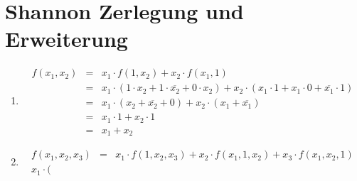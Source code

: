 \documentclass[DIN, pagenumber=false, fontsize=11pt, parskip=half]{scrartcl}
\begin{document}
    \section{Shannon Zerlegung und Erweiterung}
    \setcounter{subsection}{3}
    \begin{enumerate}[label=(\alph*)]
        \item 
            \begin{eqnarray*}
                f(x_1, x_2) &=& x_1 \cdot f(1, x_2) + x_2 \cdot f(x_1, 1) \\
                &=& x_1 \cdot (1 \cdot x_2 + 1 \cdot \overline{x_2} + 0 \cdot x_2) + x_2 \cdot (x_1 \cdot 1 + x_1 \cdot 0 + \overline{x_1} \cdot 1) \\
                &=& x_1 \cdot (x_2 + \overline{x_2} + 0) + x_2 \cdot (x_1 + \overline{x_1}) \\
                &=& x_1 \cdot 1 + x_2 \cdot 1 \\
                &=& x_1 + x_2 
            \end{eqnarray*}
        \item 
            \begin{eqnarray*}
                f(x_1, x_2, x_3) &=& x_1 \cdot f(1, x_2, x_3) + x_2 \cdot f(x_1, 1, x_2) + x_3 \cdot f(x_1, x_2, 1) \\
                x_1 \cdot (
            \end{eqnarray*}
    \end{enumerate}
\end{document}
